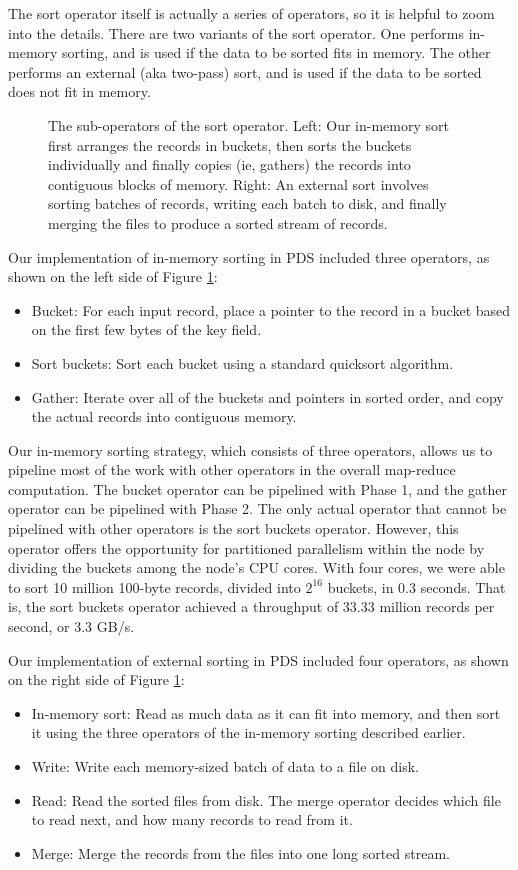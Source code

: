 \documentclass{acm_proc_article-sp}
\begin{document}
The sort operator itself is actually a series of operators, so it is helpful to zoom into the details. There are two variants of the sort operator. One performs in-memory sorting, and is used if the data to be sorted fits in memory. The other performs an external (aka two-pass) sort, and is used if the data to be sorted does not fit in memory.

\begin{figure}
\caption{The sub-operators of the sort operator. Left: Our in-memory sort first arranges the records in buckets, then sorts the buckets individually and finally copies (ie, gathers) the records into contiguous blocks of memory. Right: An external sort involves sorting batches of records, writing each batch to disk, and finally merging the files to produce a sorted stream of records.}
\label{fig:sort}
\end{figure}

Our implementation of in-memory sorting in PDS included three operators, as
shown on the left side of Figure \ref{fig:sort}:
\begin{itemize}
  \item Bucket: For each input record, place a pointer to the record in a bucket based on the first few bytes of the key field.
  \item Sort buckets: Sort each bucket using a standard quicksort algorithm.
  \item Gather: Iterate over all of the buckets and pointers in sorted order,
  and copy the actual records into contiguous memory.
\end{itemize}

Our in-memory sorting strategy, which consists of three operators, allows us to
pipeline most of the work with other operators in the overall map-reduce
computation. The bucket operator can be pipelined with Phase 1, and the gather
operator can be pipelined with Phase 2. The only actual operator that cannot be
pipelined with other operators is the sort buckets operator. However, this
operator offers the opportunity for partitioned parallelism within the node by
dividing the buckets among the node's CPU cores. With four cores, we were
able to sort 10 million 100-byte records, divided into $2^{16}$ buckets, in 0.3
seconds. That is, the sort buckets operator achieved a throughput of 33.33
million records per second, or 3.3 GB/s.

Our implementation of external sorting in PDS included four operators, as shown on the right side of Figure \ref{fig:sort}:
\begin{itemize}
  \item In-memory sort: Read as much data as it can fit into memory, and then
  sort it using the three operators of the in-memory sorting described earlier.
  \item Write: Write each memory-sized batch of data to a file on disk.
  \item Read: Read the sorted files from disk. The merge operator decides which
  file to read next, and how many records to read from it.
  \item Merge: Merge the records from the files into one long sorted stream.
\end{itemize}
\end{document}
